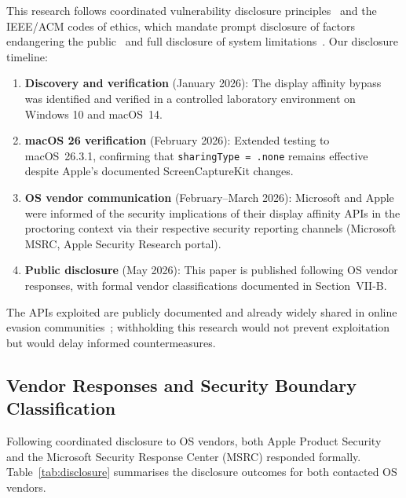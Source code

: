 \documentclass[conference]{IEEEtran}
\begin{document}
This research follows coordinated vulnerability disclosure principles~\cite{acm2018code,ieee2024code,owasp2025disclosure,first2020guidelines,cisa2025coordinated} and the IEEE/ACM codes of ethics, which mandate prompt disclosure of factors endangering the public~\cite{ieee2024code} and full disclosure of system limitations~\cite{acm2018code}. Our disclosure timeline:

\begin{enumerate}
\item \textbf{Discovery and verification} (January 2026): The display affinity bypass was identified and verified in a controlled laboratory environment on Windows 10 and macOS~14.
\item \textbf{macOS 26 verification} (February 2026): Extended testing to macOS~26.3.1, confirming that \texttt{sharingType = .none} remains effective despite Apple's documented ScreenCaptureKit changes.
\item \textbf{OS vendor communication} (February--March 2026): Microsoft and Apple were informed of the security implications of their display affinity APIs in the proctoring context via their respective security reporting channels (Microsoft MSRC, Apple Security Research portal).
\item \textbf{Public disclosure} (May 2026): This paper is published following OS vendor responses, with formal vendor classifications documented in Section~VII-B.
\end{enumerate}

The APIs exploited are publicly documented and already widely shared in online evasion communities~\cite{simko2024modern}; withholding this research would not prevent exploitation but would delay informed countermeasures.

\subsection{Vendor Responses and Security Boundary Classification}

Following coordinated disclosure to OS vendors, both Apple Product Security and the Microsoft Security Response Center (MSRC) responded formally. Table~\ref{tab:disclosure} summarises the disclosure outcomes for both contacted OS vendors.

\begin{table}[t]
\centering
\caption{Coordinated Disclosure Summary}
\label{tab:disclosure}
\end{table}
\end{document}
